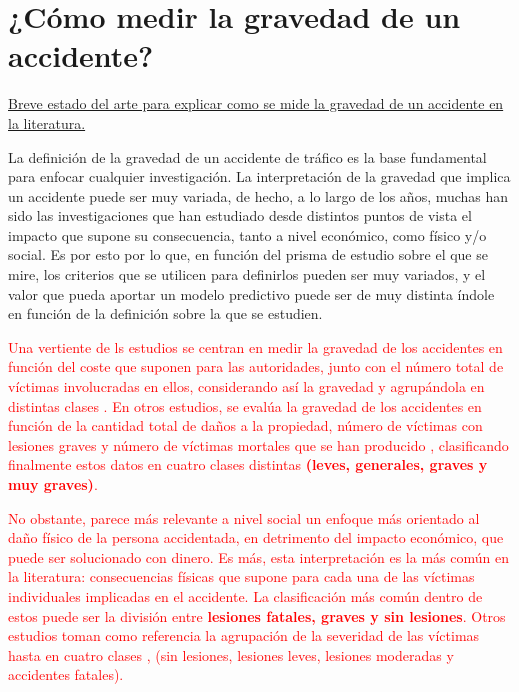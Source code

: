 \documentclass{uathesis-es}
\begin{document}
\section{¿Cómo medir la gravedad de un accidente?}
\underline{Breve estado del arte para explicar como se mide la gravedad de un accidente en la literatura.}

La definición de la gravedad de un accidente de tráfico es la base fundamental para enfocar cualquier investigación. La interpretación de la gravedad que implica un accidente puede ser muy variada, de hecho, a lo largo de los años, muchas han sido las investigaciones que han estudiado desde distintos puntos de vista el impacto que supone su consecuencia, tanto a nivel económico, como físico y/o social. Es por esto por lo que, en función del prisma de estudio sobre el que se mire, los criterios que se utilicen para definirlos pueden ser muy variados, y el valor que pueda aportar un modelo predictivo puede ser de muy distinta índole en función de la definición sobre la que se estudien.


\textcolor{red}{Una vertiente de ls estudios se centran en medir la gravedad de los accidentes en función del coste que suponen para las autoridades, junto con el número total de víctimas involucradas en ellos, considerando así la gravedad y agrupándola en distintas clases \cite{app7060476}. En otros estudios, se evalúa la gravedad de los accidentes en función de la cantidad total de daños a la propiedad, número de víctimas con lesiones graves y número de víctimas mortales que se han producido \cite{Yang2023}, clasificando finalmente estos datos en cuatro clases distintas \textbf{(leves, generales, graves y muy graves)}.}

\textcolor{red}{No obstante, parece más relevante a nivel social un enfoque más orientado al daño físico de la persona accidentada, en detrimento del impacto económico, que puede ser solucionado con dinero. Es más, esta interpretación es la más común en la literatura: consecuencias físicas que supone para cada una de las víctimas individuales implicadas en el accidente. La clasificación más común dentro de estos puede ser la división entre \textbf{lesiones fatales, graves y sin lesiones}. Otros estudios toman como referencia la agrupación de la severidad de las víctimas hasta en cuatro clases \cite{panicker2022injury}, (sin lesiones, lesiones leves, lesiones moderadas y accidentes fatales).}
\end{document}

